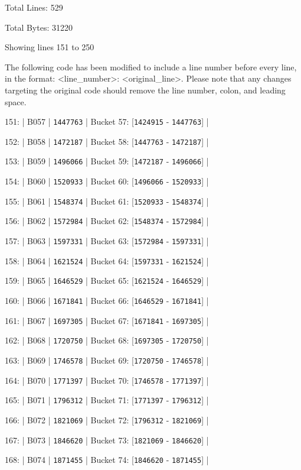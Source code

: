 \documentclass[11pt,a4paper]{article}
\begin{document}
Total Lines: 529

Total Bytes: 31220

Showing lines 151 to 250

The following code has been modified to include a line number before every line, in the format: <line\_number>: <original\_line>. Please note that any changes targeting the original code should remove the line number, colon, and leading space.

151: | B057 | \texttt{1447763} | Bucket 57: [\texttt{1424915} - \texttt{1447763}] |

152: | B058 | \texttt{1472187} | Bucket 58: [\texttt{1447763} - \texttt{1472187}] |

153: | B059 | \texttt{1496066} | Bucket 59: [\texttt{1472187} - \texttt{1496066}] |

154: | B060 | \texttt{1520933} | Bucket 60: [\texttt{1496066} - \texttt{1520933}] |

155: | B061 | \texttt{1548374} | Bucket 61: [\texttt{1520933} - \texttt{1548374}] |

156: | B062 | \texttt{1572984} | Bucket 62: [\texttt{1548374} - \texttt{1572984}] |

157: | B063 | \texttt{1597331} | Bucket 63: [\texttt{1572984} - \texttt{1597331}] |

158: | B064 | \texttt{1621524} | Bucket 64: [\texttt{1597331} - \texttt{1621524}] |

159: | B065 | \texttt{1646529} | Bucket 65: [\texttt{1621524} - \texttt{1646529}] |

160: | B066 | \texttt{1671841} | Bucket 66: [\texttt{1646529} - \texttt{1671841}] |

161: | B067 | \texttt{1697305} | Bucket 67: [\texttt{1671841} - \texttt{1697305}] |

162: | B068 | \texttt{1720750} | Bucket 68: [\texttt{1697305} - \texttt{1720750}] |

163: | B069 | \texttt{1746578} | Bucket 69: [\texttt{1720750} - \texttt{1746578}] |

164: | B070 | \texttt{1771397} | Bucket 70: [\texttt{1746578} - \texttt{1771397}] |

165: | B071 | \texttt{1796312} | Bucket 71: [\texttt{1771397} - \texttt{1796312}] |

166: | B072 | \texttt{1821069} | Bucket 72: [\texttt{1796312} - \texttt{1821069}] |

167: | B073 | \texttt{1846620} | Bucket 73: [\texttt{1821069} - \texttt{1846620}] |

168: | B074 | \texttt{1871455} | Bucket 74: [\texttt{1846620} - \texttt{1871455}] |
\end{document}
